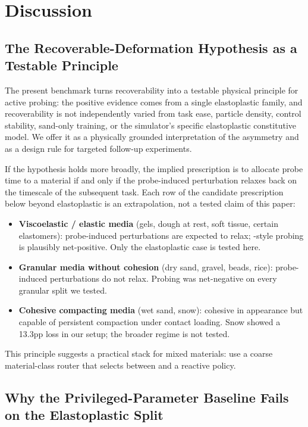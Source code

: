 \section{Discussion}
\label{sec:discussion}

\subsection{The Recoverable-Deformation Hypothesis as a Testable Principle}

The present benchmark turns recoverability into a testable physical principle for active probing: the positive evidence comes from a single elastoplastic family, and recoverability is not independently varied from task ease, particle density, control stability, sand-only training, or the simulator's specific elastoplastic constitutive model. We offer it as a physically grounded interpretation of the asymmetry and as a design rule for targeted follow-up experiments.

If the hypothesis holds more broadly, the implied prescription is to allocate probe time to a material if and only if the probe-induced perturbation relaxes back on the timescale of the subsequent task. Each row of the candidate prescription below beyond elastoplastic is an extrapolation, not a tested claim of this paper:
\begin{itemize}
    \item \textbf{Viscoelastic / elastic media} (gels, dough at rest, soft tissue, certain elastomers): probe-induced perturbations are expected to relax; \PTA{}-style probing is plausibly net-positive. Only the elastoplastic case is tested here.
    \item \textbf{Granular media without cohesion} (dry sand, gravel, beads, rice): probe-induced perturbations do not relax. Probing was net-negative on every granular split we tested.
    \item \textbf{Cohesive compacting media} (wet sand, snow): cohesive in appearance but capable of persistent compaction under contact loading. Snow showed a 13.3pp loss in our setup; the broader regime is not tested.
\end{itemize}

This principle suggests a practical stack for mixed materials: use a coarse material-class router that selects between \PTA{} and a reactive policy.

\subsection{Why the Privileged-Parameter Baseline Fails on the Elastoplastic Split}

